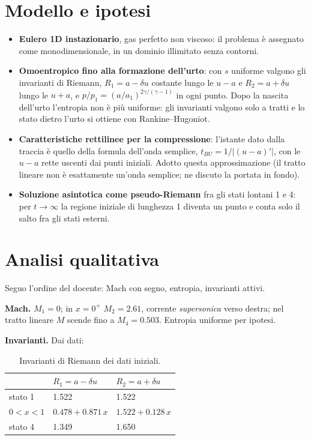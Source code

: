 \documentclass[11pt,a4paper]{article}
\newcommand{\uma}{u-a}
\newcommand{\upa}{u+a}
\begin{document}
\section{Modello e ipotesi}
\begin{itemize}
\item \textbf{Eulero 1D instazionario}, gas perfetto non viscoso: il problema è assegnato come
  monodimensionale, in un dominio illimitato senza contorni.
\item \textbf{Omoentropico fino alla formazione dell'urto}: con $s$ uniforme valgono gli invarianti di Riemann,
  $R_1=a-\delta u$ costante lungo le $\uma$ e $R_2=a+\delta u$ lungo le $\upa$, e
  $p/p_1=(a/a_1)^{2\gamma/(\gamma-1)}$ in ogni punto. Dopo la nascita dell'urto l'entropia non è più uniforme:
  gli invarianti valgono solo a tratti e lo stato dietro l'urto si ottiene con Rankine--Hugoniot.
\item \textbf{Caratteristiche rettilinee per la compressione}: l'istante dato dalla traccia è quello della
  formula dell'onda semplice, $t_{BU}=1/|(u-a)'|$, con le $\uma$ rette uscenti dai punti iniziali. Adotto questa
  approssimazione (il tratto lineare non è esattamente un'onda semplice; ne discuto la portata in fondo).
\item \textbf{Soluzione asintotica come pseudo-Riemann} fra gli stati lontani 1 e 4: per $t\to\infty$ la
  regione iniziale di lunghezza 1 diventa un punto e conta solo il salto fra gli stati esterni.
\end{itemize}

\section{Analisi qualitativa}
Seguo l'ordine del docente: Mach con segno, entropia, invarianti attivi.

\textbf{Mach.} $M_1=0$; in $x=0^+$ $M_2=\num{2.61}$, corrente \emph{supersonica} verso destra; nel tratto
lineare $M$ scende fino a $M_4=\num{0.503}$. Entropia uniforme per ipotesi.

\textbf{Invarianti.} Dai dati:
\begin{table}[H]
  \centering
  \begin{tabular}{lll}
    \toprule
    & $R_1=a-\delta u$ & $R_2=a+\delta u$ \\
    \midrule
    stato 1 & \num{1.522} & \num{1.522} \\
    $0<x<1$ & $\num{0.478}+\num{0.871}\,x$ & $\num{1.522}+\num{0.128}\,x$ \\
    stato 4 & \num{1.349} & \num{1.650} \\
    \bottomrule
  \end{tabular}
  \caption{Invarianti di Riemann dei dati iniziali.}
\end{table}
\end{document}
